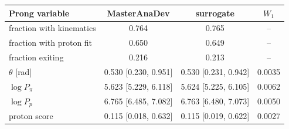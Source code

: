 \begin{tabular}{lccc}
\toprule
Prong variable & MasterAnaDev & surrogate & $W_1$ \\
\midrule
fraction with kinematics & 0.764 & 0.765 & -- \\
fraction with proton fit & 0.650 & 0.649 & -- \\
fraction exiting & 0.216 & 0.213 & -- \\
$\theta$ [rad] & 0.530 [0.230, 0.951] & 0.530 [0.231, 0.942] & 0.0035 \\
$\log P_\pi$ & 5.623 [5.229, 6.118] & 5.624 [5.225, 6.105] & 0.0062 \\
$\log P_p$ & 6.765 [6.485, 7.082] & 6.763 [6.480, 7.073] & 0.0050 \\
proton score & 0.115 [0.018, 0.632] & 0.115 [0.019, 0.622] & 0.0027 \\
\bottomrule
\end{tabular}
